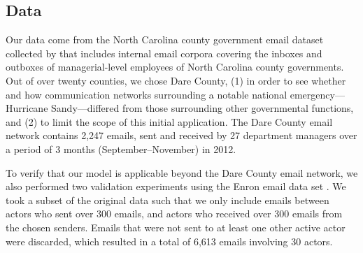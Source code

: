 \documentclass{article}
\begin{document}
\subsection{Data}\label{subsec:Data}
Our data come from the North Carolina county government email dataset collected by \cite{ben2017transparency} that includes internal email corpora covering the inboxes and outboxes of managerial-level employees of North Carolina county governments. Out of over twenty counties, we chose Dare County, (1) in order to see whether and how communication networks surrounding a notable national emergency---Hurricane Sandy---differed from those surrounding other governmental functions, and (2) to limit the scope of this initial application. The Dare County email network contains 2,247 emails, sent and received by 27 department managers over a period of 3 months (September--November) in 2012. 

To verify that our model is applicable beyond the Dare County email network, we also performed two validation experiments using the Enron email data set \cite{klimt2004introducing}. We took a subset of the original data such that we only include emails between actors who sent over 300 emails, and actors who received over 300 emails from the chosen senders. Emails that were not sent to at least one other active actor were discarded, which resulted in a total of 6,613 emails involving 30 actors. 
\end{document}
